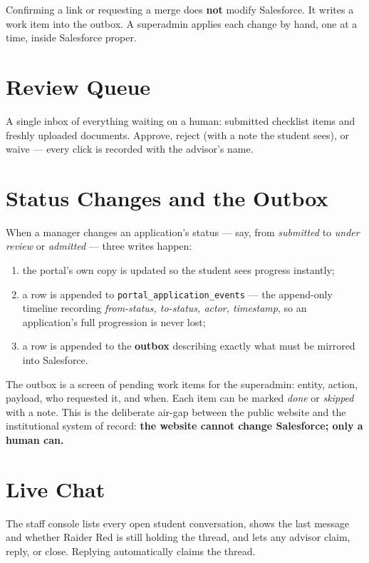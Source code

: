 \documentclass[11pt,letterpaper]{report}
\begin{document}
\begin{warnbox}
Confirming a link or requesting a merge does \textbf{not} modify Salesforce.
It writes a work item into the outbox. A superadmin applies each change by
hand, one at a time, inside Salesforce proper.
\end{warnbox}

\section{Review Queue}

A single inbox of everything waiting on a human: submitted checklist items and
freshly uploaded documents. Approve, reject (with a note the student sees), or
waive --- every click is recorded with the advisor's name.

\section{Status Changes and the Outbox}

When a manager changes an application's status --- say, from \emph{submitted} to
\emph{under review} or \emph{admitted} --- three writes happen:

\begin{enumerate}[leftmargin=1.6em]
  \item the portal's own copy is updated so the student sees progress instantly;
  \item a row is appended to \texttt{portal\_application\_events} --- the
        append-only timeline recording \emph{from-status, to-status, actor,
        timestamp}, so an application's full progression is never lost;
  \item a row is appended to the \textbf{outbox} describing exactly what must be
        mirrored into Salesforce.
\end{enumerate}

The outbox is a screen of pending work items for the superadmin: entity, action,
payload, who requested it, and when. Each item can be marked \emph{done} or
\emph{skipped} with a note. This is the deliberate air-gap between the public
website and the institutional system of record: \textbf{the website cannot
change Salesforce; only a human can.}

\section{Live Chat}

The staff console lists every open student conversation, shows the last message
and whether Raider Red is still holding the thread, and lets any advisor claim,
reply, or close. Replying automatically claims the thread.
\end{document}
